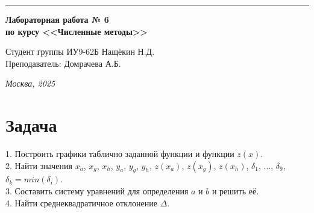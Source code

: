 \documentclass[a4paper, 14pt]{extarticle}
\begin{document}
\begin{titlepage}
\vspace*{-16pt}
\hspace{30pt}\rule{0.866\textwidth}{0.4pt}
  
\vspace{11em}

\begin{center}
\Large {\bf Лабораторная работа № 6} \\ 
\large {\bf по курсу <<Численные методы>>} \\ 
\end{center}\normalsize

\vspace{8em}


\begin{flushright}
  {Студент группы ИУ9-62Б Нащёкин Н.Д.\hspace*{15pt} \\
  \vspace{2ex}
  Преподаватель: Домрачева А.Б.\hspace*{15pt}}
\end{flushright}

\bigskip

\vfill
 

\begin{center}
\textsl{Москва, 2025}
\end{center}
\end{titlepage}

\renewcommand{\ttdefault}{pcr}

\setlength{\tabcolsep}{3pt}
\newpage
\setcounter{page}{2}

\section{Задача}
\begin{justify}
1. Построить графики таблично заданной функции и функции $z(x)$. \\
2. Найти значения $x_a$, $x_g$, $x_h$, $y_a$, $y_g$, $y_h$, $z(x_a)$, $z(x_g)$, $z(x_h)$, 
$\delta_1$, ..., $\delta_9$, $\delta_k = min(\delta_i)$.\\
3. Составить систему уравнений для определения $a$ и $b$ и решить её.  \\ 
4. Найти среднеквадратичное отклонение $\Delta$.


\end{justify}
\pagebreak
\end{document}
